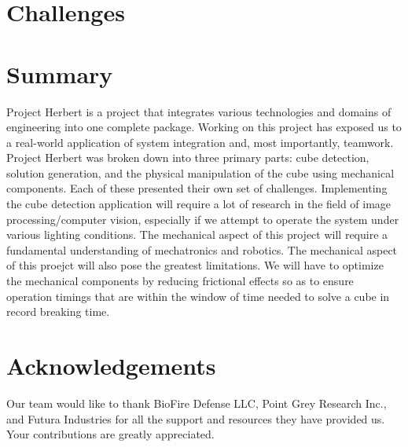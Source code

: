 \documentclass[final, letterpaper, 10 pt, conference, onecolumn]{IEEEtran}
\begin{document}
\section{Challenges}

\section{Summary}
Project Herbert is a project that integrates various technologies and domains of engineering into one complete package. Working on this project has exposed us to a real-world application of system integration and, most importantly, teamwork. Project Herbert was broken down into three primary parts: cube detection, solution generation, and the physical manipulation of the cube using mechanical components. Each of these presented their own set of challenges. Implementing the cube detection application will require a lot of research in the field of image processing/computer vision, especially if we attempt to operate the system under various lighting conditions. The mechanical
aspect of this project will require a fundamental understanding of mechatronics and robotics. The mechanical aspect of this proejct will also pose the greatest limitations. We will have to optimize the mechanical components by reducing frictional effects so as to ensure operation timings that are
within the window of time needed to solve a cube in record breaking time.

\section{Acknowledgements}
Our team would like to thank BioFire Defense LLC, Point Grey Research Inc., and Futura Industries for all the support and resources they have provided us. Your contributions are greatly appreciated.
\end{document}
